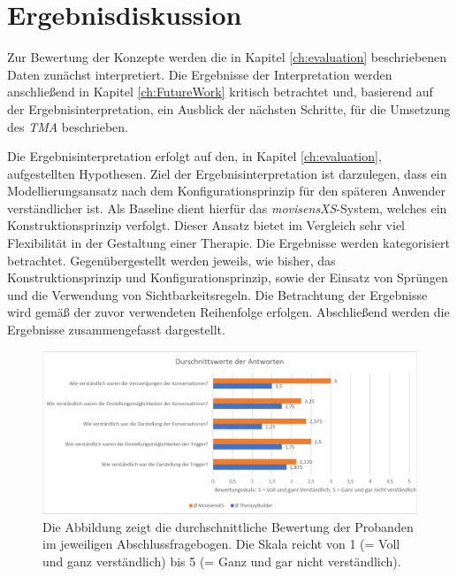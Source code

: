 \chapter{Ergebnisdiskussion}
\label{ch:Results}
Zur Bewertung der Konzepte werden die in Kapitel \ref{ch:evaluation} beschriebenen Daten zunächst interpretiert. Die Ergebnisse der Interpretation werden anschließend in Kapitel \ref{ch:FutureWork} kritisch betrachtet und, basierend auf der Ergebnisinterpretation, ein Ausblick der nächsten Schritte, für die Umsetzung des \emph{TMA} beschrieben. 

Die Ergebnisinterpretation erfolgt auf den, in Kapitel \ref{ch:evaluation}, aufgestellten Hypothesen. Ziel der Ergebnisinterpretation ist darzulegen, dass ein Modellierungsansatz nach dem Konfigurationsprinzip für den späteren Anwender verständlicher ist. Als Baseline dient hierfür das \emph{movisensXS}-System, welches ein Konstruktionsprinzip verfolgt. Dieser Ansatz bietet im Vergleich sehr viel Flexibilität in der Gestaltung einer Therapie. Die Ergebnisse werden kategorisiert betrachtet. Gegenübergestellt werden jeweils, wie bisher, das Konstruktionsprinzip und Konfigurationsprinzip, sowie der Einsatz von Sprüngen und die Verwendung von Sichtbarkeitsregeln. Die Betrachtung der Ergebnisse wird gemäß der zuvor verwendeten Reihenfolge erfolgen. Abschließend werden die Ergebnisse zusammengefasst dargestellt.

 
\begin{figure}[h]
\centering
\includegraphics[width=1\textwidth]{pictures/diagramme/antwortendurchsch1}
\caption{Die Abbildung zeigt die durchschnittliche Bewertung der Probanden im jeweiligen Abschlussfragebogen. Die Skala reicht von 1 (= Voll und ganz verständlich) bis 5 (= Ganz und gar nicht verständlich).}
\label{antwortendurchsch11}
\end{figure}

